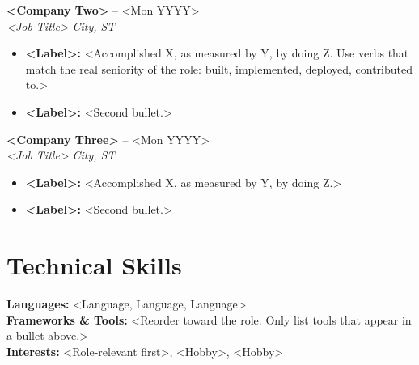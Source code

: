 \documentclass[10pt,letterpaper]{article}
\begin{document}
\textbf{<Company Two>}  -- <Mon YYYY> \\[-2pt]
\textit{<Job Title>} \hfill \textit{City, ST}
\begin{itemize}[noitemsep,topsep=2pt]
    \item \textbf{<Label>:} <Accomplished X, as measured by Y, by doing Z. Use verbs that match the real seniority of the role: built, implemented, deployed, contributed to.>
    \item \textbf{<Label>:} <Second bullet.>
\end{itemize}

\textbf{<Company Three>}  -- <Mon YYYY> \\[-2pt]
\textit{<Job Title>} \hfill \textit{City, ST}
\begin{itemize}[noitemsep,topsep=2pt]
    \item \textbf{<Label>:} <Accomplished X, as measured by Y, by doing Z.>
    \item \textbf{<Label>:} <Second bullet.>
\end{itemize}
\vspace{-1pt}

\section*{Technical Skills}

\textbf{Languages:} <Language, Language, Language> \\[0.5pt]
\textbf{Frameworks \& Tools:} <Reorder toward the role. Only list tools that appear in a bullet above.> \\[0.5pt]
\textbf{Interests:} <Role-relevant first>, <Hobby>, <Hobby>
\end{document}
